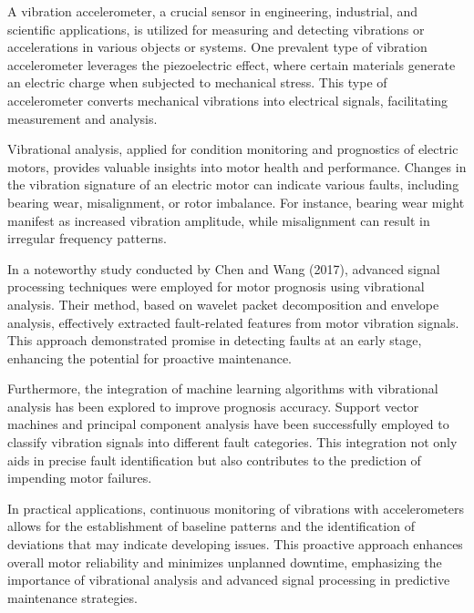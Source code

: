 A vibration accelerometer, a crucial sensor in engineering, industrial, and scientific applications, is utilized for measuring and detecting vibrations or accelerations in various objects or systems. One prevalent type of vibration accelerometer leverages the piezoelectric effect, where certain materials generate an electric charge when subjected to mechanical stress. This type of accelerometer converts mechanical vibrations into electrical signals, facilitating measurement and analysis.

Vibrational analysis, applied for condition monitoring and prognostics of electric motors, provides valuable insights into motor health and performance. Changes in the vibration signature of an electric motor can indicate various faults, including bearing wear, misalignment, or rotor imbalance. For instance, bearing wear might manifest as increased vibration amplitude, while misalignment can result in irregular frequency patterns.

In a noteworthy study conducted by Chen and Wang (2017), advanced signal processing techniques were employed for motor prognosis using vibrational analysis. Their method, based on wavelet packet decomposition and envelope analysis, effectively extracted fault-related features from motor vibration signals. This approach demonstrated promise in detecting faults at an early stage, enhancing the potential for proactive maintenance.

Furthermore, the integration of machine learning algorithms with vibrational analysis has been explored to improve prognosis accuracy. Support vector machines and principal component analysis have been successfully employed to classify vibration signals into different fault categories. This integration not only aids in precise fault identification but also contributes to the prediction of impending motor failures.

In practical applications, continuous monitoring of vibrations with accelerometers allows for the establishment of baseline patterns and the identification of deviations that may indicate developing issues. This proactive approach enhances overall motor reliability and minimizes unplanned downtime, emphasizing the importance of vibrational analysis and advanced signal processing in predictive maintenance strategies.